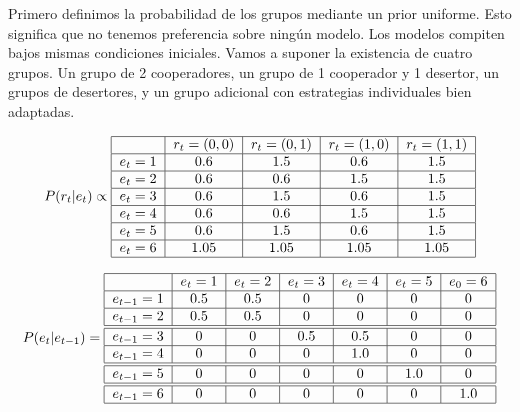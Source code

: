 \documentclass[a4paper,10pt]{article}
\begin{document}
Primero definimos la probabilidad de los grupos mediante un prior uniforme.
Esto significa que no tenemos preferencia sobre ningún modelo.
Los modelos compiten bajos mismas condiciones iniciales.
Vamos a suponer la existencia de cuatro grupos.
Un grupo de 2 cooperadores, un grupo de 1 cooperador y 1 desertor, un grupos de desertores, y un grupo adicional con estrategias individuales bien adaptadas.

\begin{align}
\centering
P(r_{t}|e_{t}) \propto \begin{tabular}{|c|c|c|c|c|c|c|}
        \hline
        & $r_t=(0,0)$ & $r_t=(0,1)$ & $r_t=(1,0)$ &  $r_t=(1,1)$  \\ \hline
       $e_{t}=1$ & $0.6$ & $1.5$ & $0.6$ & $1.5$ \\ \hline
       $e_{t}=2$ & $0.6$ & $0.6$ & $1.5$ & $1.5$  \\ \hline
       $e_{t}=3$ & $0.6$ & $1.5$ & $0.6$ & $1.5$  \\ \hline
       $e_{t}=4$ & $0.6$ & $0.6$ & $1.5$ & $1.5$ \\ \hline
       $e_{t}=5$ & $0.6$ & $1.5$ & $0.6$ & $1.5$ \\ \hline
       $e_{t}=6$ & $1.05$ & $1.05$ & $1.05$ & $1.05$  \\ \hline
\end{tabular}
\end{align}





\begin{align}
\centering
P(e_{t}|e_{t-1}) = \begin{tabular}{|c|c|c|c|c|c|c|}
        \hline
        & $e_t=1$ & $e_t=2$ & $e_t=3$ &  $e_t=4$ & $e_t=5$ & $e_0=6$ \\ \hline
       $e_{t-1}=1$ & $0.5$ & $0.5$ & $0$ &  $0$ & $0$ & $0$ \\ \hline
       $e_{t-1}=2$ & $0.5$ & $0.5$ & $0$ & $0$ & $0$ & $0$ \\ \hline \hline
       $e_{t-1}=3$ & $0$ & $0$ & $0.5$ & $0.5$ & $0$ & $0$ \\ \hline
       $e_{t-1}=4$ & $0$ & $0$ & $0$ & $1.0$ & $0$ & $0$ \\ \hline \hline
       $e_{t-1}=5$ & $0$ & $0$ & $0$ & $0$ & $1.0$ & $0$ \\ \hline \hline
       $e_{t-1}=6$ & $0$ & $0$ & $0$ & $0$ & $0$ & $1.0$ \\ \hline
\end{tabular}
\end{align}
\end{document}
